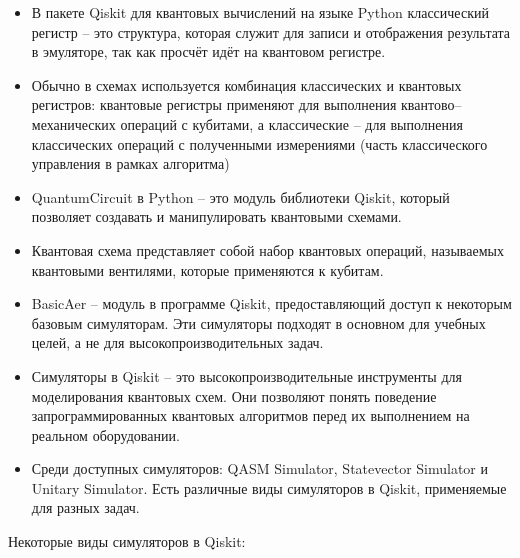 \documentclass[12pt,a4paper]{article}
\begin{document}
\begin{itemize}
		\item	В пакете Qiskit для квантовых вычислений на языке Python классический регистр -- это структура, которая служит для записи и отображения результата в эмуляторе, так как просчёт идёт на квантовом регистре.
		
		\item	Обычно в схемах используется комбинация классических и квантовых регистров: квантовые регистры применяют для выполнения квантово--механических операций с кубитами, а классические -- для выполнения классических операций с полученными измерениями (часть классического управления в рамках алгоритма)
	\end{itemize}
	
	
	\begin{itemize}
		
		
		\item QuantumCircuit в Python -- это модуль библиотеки Qiskit, который позволяет создавать и манипулировать квантовыми схемами.
		\item Квантовая схема представляет собой набор квантовых операций, называемых квантовыми вентилями, которые применяются к кубитам.
		
		\item BasicAer -- модуль в программе Qiskit, предоставляющий доступ к некоторым базовым симуляторам. Эти симуляторы подходят в основном для учебных целей, а не для высокопроизводительных задач.
		
		\item Симуляторы в Qiskit -- это высокопроизводительные инструменты для моделирования квантовых схем. Они позволяют понять поведение запрограммированных квантовых алгоритмов перед их выполнением на реальном оборудовании.
		
		\item Среди доступных симуляторов: QASM Simulator, Statevector Simulator и Unitary Simulator.
		Есть различные виды симуляторов в Qiskit, применяемые для разных задач.
		
	\end{itemize}
	Некоторые виды симуляторов в Qiskit:\\
\end{document}
